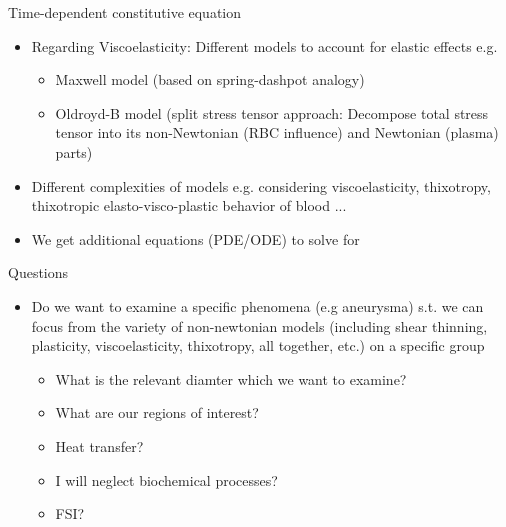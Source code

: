 \documentclass{beamer}
\begin{document}
	\begin{frame}{Time-dependent constitutive equation}
		\begin{itemize}
			\item Regarding Viscoelasticity: Different models to account for elastic effects e.g.
			\begin{itemize}
			\item Maxwell model (based on spring-dashpot analogy)
			\item Oldroyd-B model (split stress tensor approach: Decompose total stress tensor into its non-Newtonian (RBC influence) and Newtonian (plasma) parts)
\end{itemize}			 
\item Different complexities of models e.g. considering viscoelasticity, thixotropy, thixotropic elasto-visco-plastic behavior of blood  ...
			\item We get additional equations (PDE/ODE) to solve for
		\end{itemize}
		
	\end{frame}
	
	
	
	
	
	
	\begin{frame}{Questions}
		\begin{itemize}
		\item Do we want to examine a specific phenomena (e.g aneurysma) s.t. we can
focus from the variety of non-newtonian models (including shear thinning, plasticity, viscoelasticity, thixotropy, all together, etc.) on a specific group
\begin{itemize}
    \item What is the relevant diamter which we want to examine?
    \item What are our regions of interest?
    \item Heat transfer?
    \item I will neglect biochemical processes?
    \item FSI?
\end{itemize}
		\end{itemize}
		
	\end{frame}
	
	
	
	
%		
%			
%				
\end{document}
